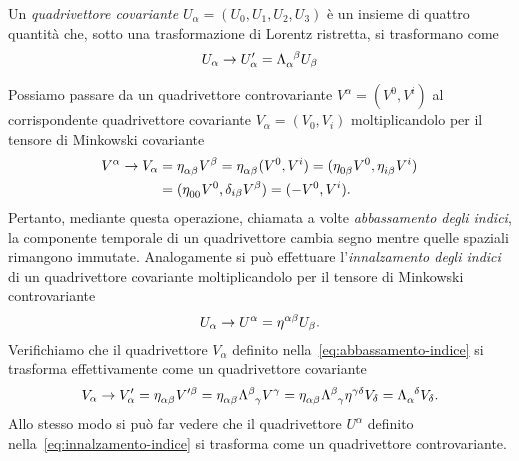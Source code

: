Un \emph{quadrivettore covariante}
$U_{\alpha} = (U_{0}, U_{1}, U_{2}, U_{3})$ è un insieme di quattro quantità
che, sotto una trasformazione di Lorentz ristretta, si trasformano come
\begin{equation}
  U_{\alpha} \to U'_{\alpha} = \tensor{\Lambda}{_{\alpha}^{\beta}}U_{\beta}
\end{equation}

Possiamo passare da un quadrivettore controvariante
$V^{\alpha} = (V^{0}, V^{i})$ al corrispondente quadrivettore covariante
$V_{\alpha} = (V_{0}, V_{i})$ moltiplicandolo per il tensore di Minkowski
covariante
\begin{equation}
  \label{eq:abbassamento-indice}
  \begin{split}
    V^{\alpha} \to V_{\alpha} &= \tensor{\eta}{_{\alpha\beta}}V^{\beta} =
    \tensor{\eta}{_{\alpha\beta}} (V^{0}, V^{i}) =
    (\tensor{\eta}{_{0\beta}}V^{0}, \tensor{\eta}{_{i\beta}}V^{i}) \\
    &= (\tensor{\eta}{_{00}}V^{0}, \delta_{i\beta}V^{\beta}) = (-V^{0}, V^{i}).
  \end{split}
\end{equation}
Pertanto, mediante questa operazione, chiamata a volte
\emph{abbassamento degli indici}, la componente temporale di un quadrivettore
cambia segno mentre quelle spaziali rimangono immutate.  Analogamente si può
effettuare l'\emph{innalzamento degli indici} di un quadrivettore covariante
moltiplicandolo per il tensore di Minkowski controvariante
\begin{equation}
  \label{eq:innalzamento-indice}
  U_{\alpha} \to U^{\alpha} = \tensor{\eta}{^{\alpha\beta}}U_{\beta}.
\end{equation}
Verifichiamo che il quadrivettore $V_{\alpha}$ definito
nella~\eqref{eq:abbassamento-indice} si trasforma effettivamente come un
quadrivettore covariante
\begin{equation}
  V_{\alpha} \to V'_{\alpha} = \tensor{\eta}{_{\alpha\beta}}V'^{\beta} =
  \tensor{\eta}{_{\alpha\beta}} \tensor{\Lambda}{^{\beta}_{\gamma}} V^{\gamma} =
  \tensor{\eta}{_{\alpha\beta}} \tensor{\Lambda}{^{\beta}_{\gamma}}
  \tensor{\eta}{^{\gamma\delta}}V_{\delta} =
  \tensor{\Lambda}{_{\alpha}^{\delta}} V_{\delta}.
\end{equation}
Allo stesso modo si può far vedere che il quadrivettore $U^{\alpha}$ definito
nella~\eqref{eq:innalzamento-indice} si trasforma come un quadrivettore
controvariante.

